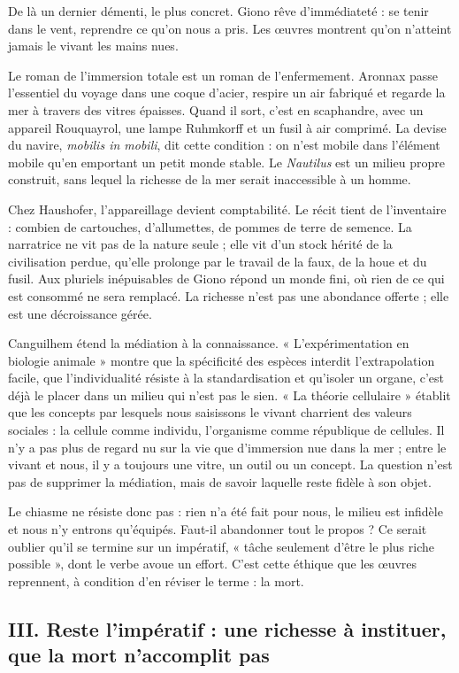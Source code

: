 \documentclass[11pt,a4paper]{article}
\begin{document}
De là un dernier démenti, le plus concret. Giono rêve d'immédiateté : se tenir dans le vent, reprendre ce qu'on nous a pris. Les œuvres montrent qu'on n'atteint jamais le vivant les mains nues.

Le roman de l'immersion totale est un roman de l'enfermement. Aronnax passe l'essentiel du voyage dans une coque d'acier, respire un air fabriqué et regarde la mer à travers des vitres épaisses. Quand il sort, c'est en scaphandre, avec un appareil Rouquayrol, une lampe Ruhmkorff et un fusil à air comprimé. La devise du navire, \emph{mobilis in mobili}, dit cette condition : on n'est mobile dans l'élément mobile qu'en emportant un petit monde stable. Le \emph{Nautilus} est un milieu propre construit, sans lequel la richesse de la mer serait inaccessible à un homme.

Chez Haushofer, l'appareillage devient comptabilité. Le récit tient de l'inventaire : combien de cartouches, d'allumettes, de pommes de terre de semence. La narratrice ne vit pas de la nature seule ; elle vit d'un stock hérité de la civilisation perdue, qu'elle prolonge par le travail de la faux, de la houe et du fusil. Aux pluriels inépuisables de Giono répond un monde fini, où rien de ce qui est consommé ne sera remplacé. La richesse n'est pas une abondance offerte ; elle est une décroissance gérée.

Canguilhem étend la médiation à la connaissance. « L'expérimentation en biologie animale » montre que la spécificité des espèces interdit l'extrapolation facile, que l'individualité résiste à la standardisation et qu'isoler un organe, c'est déjà le placer dans un milieu qui n'est pas le sien. « La théorie cellulaire » établit que les concepts par lesquels nous saisissons le vivant charrient des valeurs sociales : la cellule comme individu, l'organisme comme république de cellules. Il n'y a pas plus de regard nu sur la vie que d'immersion nue dans la mer ; entre le vivant et nous, il y a toujours une vitre, un outil ou un concept. La question n'est pas de supprimer la médiation, mais de savoir laquelle reste fidèle à son objet.

Le chiasme ne résiste donc pas : rien n'a été fait pour nous, le milieu est infidèle et nous n'y entrons qu'équipés. Faut-il abandonner tout le propos ? Ce serait oublier qu'il se termine sur un impératif, « tâche seulement d'être le plus riche possible », dont le verbe avoue un effort. C'est cette éthique que les œuvres reprennent, à condition d'en réviser le terme : la mort.

\hypertarget{iii.-reste-limpuxe9ratif-une-richesse-uxe0-instituer-que-la-mort-naccomplit-pas}{%
\subsection{III. Reste l'impératif : une richesse à instituer, que la mort n'accomplit pas}\label{iii.-reste-limpuxe9ratif-une-richesse-uxe0-instituer-que-la-mort-naccomplit-pas}}
\end{document}
